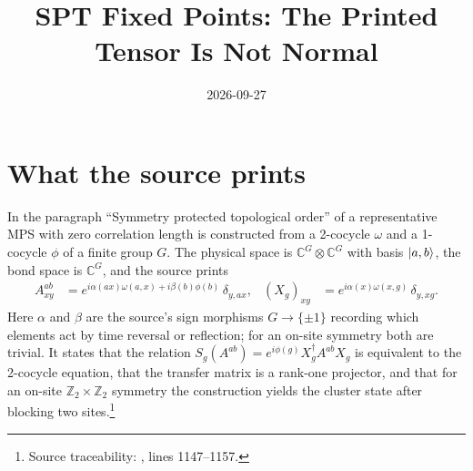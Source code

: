 \documentclass{article}
\title{SPT Fixed Points: The Printed Tensor Is Not Normal}
\author{}
\date{2026-09-27}
\begin{document}
\maketitle
{}

\section{What the source prints}
In the paragraph ``Symmetry protected topological order'' of
\cite{Cirac2021Matrix} a representative MPS with zero correlation length is
constructed from a 2-cocycle $\omega$ and a 1-cocycle $\phi$ of a finite group
$G$. The physical space is $\mathbb C^G\otimes\mathbb C^G$ with basis
$|a,b\rangle$, the bond space is $\mathbb C^G$, and the source prints
\begin{align}
    A^{ab}_{xy} & =e^{i\alpha(a x)\omega(a,x)+i\beta(b)\phi(b)}\,\delta_{y,ax},
                &
    (X_g)_{xy}  & =e^{i\alpha(x)\omega(x,g)}\,\delta_{y,xg}.
    \label{eq:rmp_spt_fixed_point_printed}
\end{align}
Here $\alpha$ and $\beta$ are the source's sign morphisms $G\to\{\pm1\}$
recording which elements act by time reversal or reflection; for an on-site
symmetry both are trivial. It states that the relation
$S_g(A^{ab})=e^{i\phi(g)}X_g^\dagger A^{ab}X_g$ is equivalent to the 2-cocycle
equation, that the transfer matrix is a rank-one projector, and that for an
on-site $\mathbb Z_2\times\mathbb Z_2$ symmetry the construction yields the
cluster state after blocking two sites.\footnote{Source traceability:
    , lines 1147--1157.}
\end{document}
